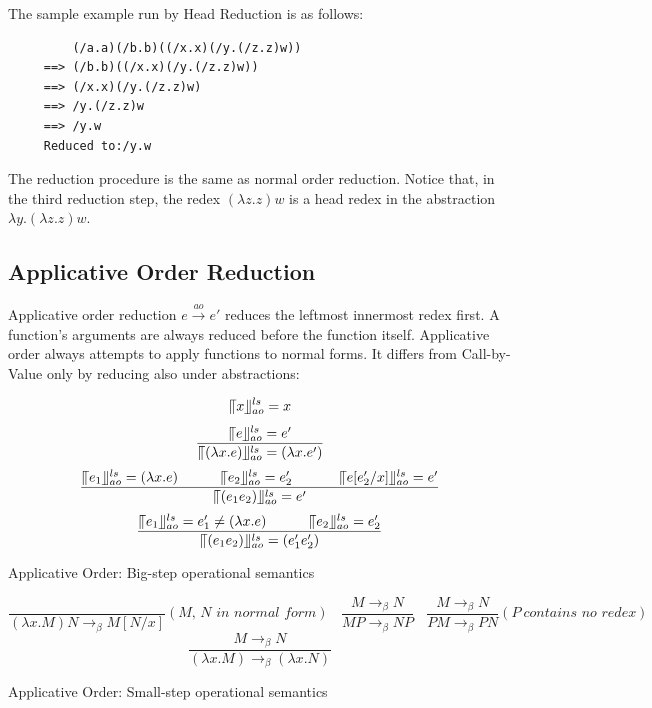 \documentclass[a4paper,11pt,twoside]{report}
\begin{document}
The sample example run by Head Reduction is as follows:

\begin{verbatim}
         (/a.a)(/b.b)((/x.x)(/y.(/z.z)w))
     ==> (/b.b)((/x.x)(/y.(/z.z)w))
     ==> (/x.x)(/y.(/z.z)w)
     ==> /y.(/z.z)w
     ==> /y.w
     Reduced to:/y.w
\end{verbatim}

The reduction procedure is the same as normal order reduction. Notice that, in the third reduction step, the redex $(\lambda z.z)w$ is a head redex in the abstraction $\lambda y.(\lambda z.z)w$. 

\subsection{Applicative Order Reduction}

Applicative order reduction $e\xrightarrow{ao} e'$ reduces the leftmost innermost redex first. A function's arguments are always reduced before the function itself. Applicative order always attempts to apply functions to normal forms. It differs from Call-by-Value only by reducing also under abstractions:


\begin{equation*}
\llceil x \rrfloor ^{ls} _{ao} = x
\end{equation*}
\begin{equation*}
\frac{\llceil e \rrfloor ^{ls} _{ao} = e'}{\llceil (\lambda x.e) \rrfloor ^{ls} _{ao} = (\lambda x.e')}
\end{equation*}
\begin{equation*}
\frac{\llceil e_1 \rrfloor ^{ls} _{ao} = (\lambda x.e)\ \ \ \ \ \ \ \ \ \llceil e_2 \rrfloor ^{ls} _{ao} = e'_2\ \ \ \ \ \ \ \ \ \ \llceil e[e'_2/x] \rrfloor ^{ls} _{ao} = e'}{\llceil (e_1e_2) \rrfloor ^{ls} _{ao} = e'}
\end{equation*}
\begin{equation*}
\frac{\llceil e_1 \rrfloor ^{ls} _{ao} = e'_1\neq (\lambda x.e)\ \ \ \ \ \ \ \ \ \llceil e_2 \rrfloor ^{ls} _{ao} = e'_2}{\llceil (e_1e_2) \rrfloor ^{ls} _{ao} = (e'_1e'_2)}
\end{equation*}
\begin{center}
Applicative Order: Big-step operational semantics
\end{center}

\begin{equation*}
\frac{}{(\lambda x.M)N \rightarrow _\beta M[N/x]}(\textit{M, N in normal form})\ \ \ \ 
\frac{M \rightarrow _\beta N}{MP \rightarrow _\beta NP}\ \ \ \ 
\frac{M \rightarrow _\beta N}{PM \rightarrow _\beta PN}(P\ \textit{contains no redex})\ \ \ \ 
\end{equation*}
\begin{equation*}
\frac{M \rightarrow _\beta N}{(\lambda x.M) \rightarrow _\beta (\lambda x.N)}
\end{equation*}
\begin{center}
Applicative Order: Small-step operational semantics
\end{center}
\end{document}
